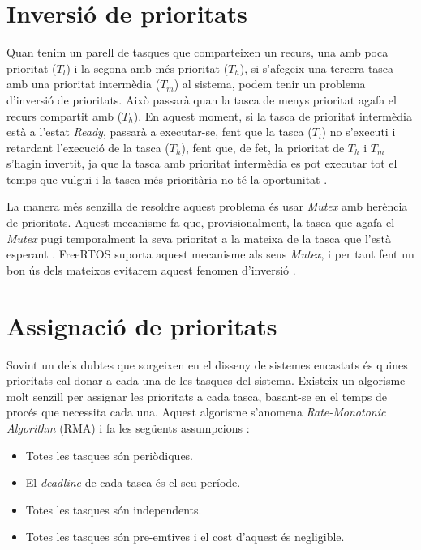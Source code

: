 \section{Inversió de prioritats}
\label{sec:priorityinv}
Quan tenim un parell de tasques que comparteixen un recurs, una amb poca prioritat ($T_l$) i la segona amb més prioritat ($T_h$), si s'afegeix una tercera tasca amb una prioritat intermèdia ($T_m$) al sistema, podem tenir un problema d'inversió de prioritats. Això passarà quan la tasca de menys prioritat agafa el recurs compartit amb ($T_h$). En aquest moment, si la tasca de prioritat intermèdia està a l'estat {\em Ready}, passarà a executar-se, fent que la tasca ($T_l$) no s'executi i retardant l'execució de la tasca ($T_h$), fent que, de fet, la prioritat de $T_h$ i $T_m$ s'hagin invertit, ja que la tasca amb prioritat intermèdia es pot executar tot el temps que vulgui i la tasca més prioritària no té la oportunitat \cite[101]{RTEmbeddedSystems}.

La manera més senzilla de resoldre aquest problema és usar {\em Mutex} amb herència de prioritats. Aquest mecanisme fa que, provisionalment, la tasca que agafa el {\em Mutex} pugi temporalment la seva prioritat a la mateixa de la tasca que l'està esperant \cite[106]{RTEmbeddedSystems}. FreeRTOS suporta aquest mecanisme als seus {\em Mutex}, i per tant fent un bon ús dels mateixos evitarem aquest fenomen d'inversió \cite[251]{FreeRTOSBook}.

\section{Assignació de prioritats}
\label{sec:priorities_RMA}
Sovint un dels dubtes que sorgeixen en el disseny de sistemes encastats és quines prioritats cal donar a cada una de les tasques del sistema. Existeix un algorisme molt senzill per assignar les prioritats a cada tasca, basant-se en el temps de procés que necessita cada una. Aquest algorisme s'anomena {\em Rate-Monotonic Algorithm} (RMA) i fa les següents assumpcions \cite{RMA_1}\cite[136]{EmbeddedBook_2}:
\begin{itemize}
 \item Totes les tasques són periòdiques.
 \item El {\em deadline} de cada tasca és el seu període.
 \item Totes les tasques són independents.
 \item Totes les tasques són pre-emtives i el cost d'aquest és negligible.
\end{itemize}

